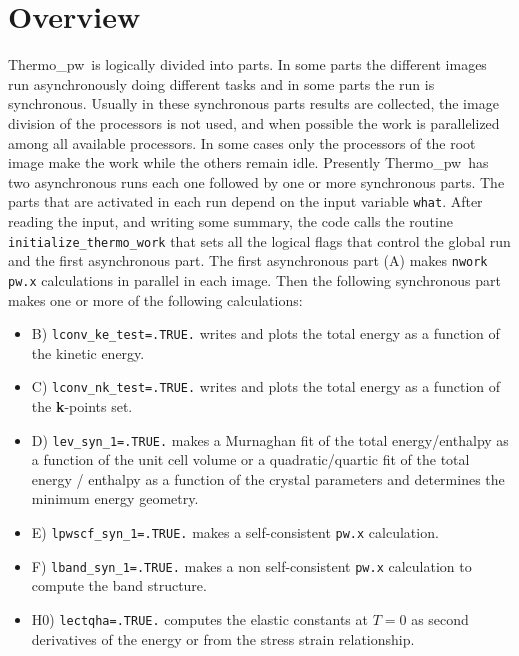 \documentclass[12pt,a4paper,twoside]{report}
\def\tpw{{\sc Thermo}\_{\sc pw}}
\begin{document}
{\color{coral}\section{Overview}}
\color{black}
\tpw\ is logically divided into parts. In some parts the different
images run asynchronously doing different tasks and in some parts the
run is synchronous. Usually in these synchronous parts results are 
collected, the image division of the processors is not used, and when possible
the work is parallelized among all available processors. In some cases
only the processors of the root image make the work while the others remain
idle.
Presently \tpw\ has two asynchronous runs each one followed
by one or more synchronous parts. The parts that are activated in
each run depend on the input variable \texttt{what}. After reading the input,
and writing some summary, the code calls the routine 
\texttt{initialize\_thermo\_work} that sets all the
logical flags that control the global run and the first asynchronous
part. The first asynchronous part (A) makes \texttt{nwork} \texttt{pw.x} 
calculations in parallel in each image. 
Then the following synchronous part makes one or more of
the following calculations:
\begin{itemize}

\item
B) \texttt{lconv\_ke\_test=.TRUE.} writes and plots the total
energy as a function of the kinetic energy.

\item
C) \texttt{lconv\_nk\_test=.TRUE.} writes and plots the total energy
as a function of the {\bf k}-points set.

\item
D) \texttt{lev\_syn\_1=.TRUE.} makes a Murnaghan fit of the 
total energy/enthalpy as a function of the unit cell volume or 
a quadratic/quartic fit of the total energy / enthalpy as a function 
of the crystal parameters and determines the minimum energy geometry.

\item
E) \texttt{lpwscf\_syn\_1=.TRUE.} makes a self-consistent \texttt{pw.x} 
calculation.

\item
F) \texttt{lband\_syn\_1=.TRUE.} makes a non self-consistent \texttt{pw.x}
calculation to compute the band structure.

\item
H0) \texttt{lectqha=.TRUE.} computes the elastic constants at $T=0$
as second derivatives of the energy or from the stress strain relationship. 

\end{itemize}
\end{document}

